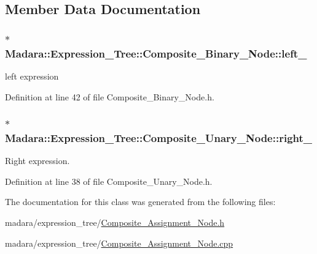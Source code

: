 \subsection{Member Data Documentation}
\hypertarget{classMadara_1_1Expression__Tree_1_1Composite__Binary__Node_acac60a70beb2484737e6e7161edb2d1b}{
\subsubsection[{left\_\-}]{$\ast$ {\bf Madara::Expression\_\-Tree::Composite\_\-Binary\_\-Node::left\_\-}}}
\label{df/d55/classMadara_1_1Expression__Tree_1_1Composite__Binary__Node_acac60a70beb2484737e6e7161edb2d1b}


left expression 



Definition at line 42 of file Composite\_\-Binary\_\-Node.h.

\hypertarget{classMadara_1_1Expression__Tree_1_1Composite__Unary__Node_a077b7bd1b52df6f5c6adfde735556a68}{
\subsubsection[{right\_\-}]{$\ast$ {\bf Madara::Expression\_\-Tree::Composite\_\-Unary\_\-Node::right\_\-}}}
\label{d3/dc7/classMadara_1_1Expression__Tree_1_1Composite__Unary__Node_a077b7bd1b52df6f5c6adfde735556a68}


Right expression. 



Definition at line 38 of file Composite\_\-Unary\_\-Node.h.



The documentation for this class was generated from the following files:\begin{DoxyCompactItemize}
\item 
madara/expression\_\-tree/\hyperlink{Composite__Assignment__Node_8h}{Composite\_\-Assignment\_\-Node.h}\item 
madara/expression\_\-tree/\hyperlink{Composite__Assignment__Node_8cpp}{Composite\_\-Assignment\_\-Node.cpp}\end{DoxyCompactItemize}
